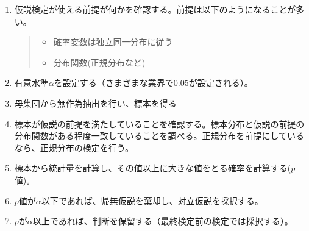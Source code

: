 \begin{framed}
    \begin{enumerate}
        \item 仮説検定が使える前提が何かを確認する。前提は以下のようになることが多い。
        \begin{quote}
            \begin{itemize}
                \item 確率変数は独立同一分布に従う
                \item 分布関数(正規分布など)
            \end{itemize}
        \end{quote}
        \item 有意水準$\alpha$を設定する（さまざまな業界で$0.05$が設定される）。
        \item 母集団から無作為抽出を行い、標本を得る
        \item 標本が仮説の前提を満たしていることを確認する。標本分布と仮説の前提の分布関数がある程度一致していることを調べる。正規分布を前提にしているなら、正規分布の検定を行う。

        \item 標本から統計量を計算し、その値以上に大きな値をとる確率を計算する($p$値)。
        \item $p$値が$\alpha$以下であれば、帰無仮説を棄却し、対立仮説を採択する。
        \item $p$が$\alpha$以上であれば、判断を保留する（最終検定前の検定では採択する）。%
    \end{enumerate}
\end{framed}






